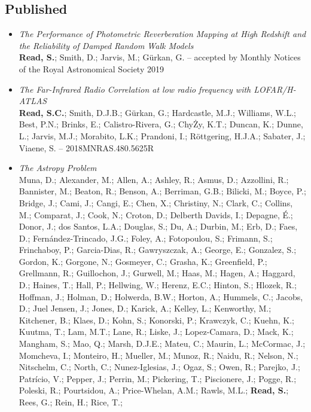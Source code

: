 \documentclass[letterpaper]{twentysecondcv} %
\begin{document}
\begin{finalpages}
\subsection{Published}
\begin{itemize}
     \item \textit{The Performance of Photometric Reverberation Mapping at High Redshift
and the Reliability of Damped Random Walk Models}\\{\small \textbf{Read, S.}; Smith, D.; Jarvis, M.; Gürkan, G. -- accepted by Monthly Notices of the Royal Astronomical Society 2019}
 \item \textit{The Far-Infrared Radio Correlation at low radio frequency with
LOFAR/H-ATLAS}\\{\small \textbf{Read, S.C.}; Smith, D.J.B.; Gürkan, G.; Hardcastle, M.J.;
Williams, W.L.; Best, P.N.; Brinks, E.; Calistro-Rivera, G.; ChyŻy,
K.T.; Duncan, K.; Dunne, L.; Jarvis, M.J.; Morabito, L.K.; Prandoni, I.;
Röttgering, H.J.A.; Sabater, J.; Viaene, S. -- 2018MNRAS.480.5625R}
 \item \textit{The Astropy Problem}\\{\small Muna, D.; Alexander, M.; Allen, A.; Ashley, R.; Asmus, D.; Azzollini,
R.; Bannister, M.; Beaton, R.; Benson, A.; Berriman, G.B.; Bilicki, M.;
Boyce, P.; Bridge, J.; Cami, J.; Cangi, E.; Chen, X.; Christiny, N.;
Clark, C.; Collins, M.; Comparat, J.; Cook, N.; Croton, D.; Delberth
Davids, I.; Depagne, É.; Donor, J.; dos Santos, L.A.; Douglas, S.; Du,
A.; Durbin, M.; Erb, D.; Faes, D.; Fernández-Trincado, J.G.; Foley, A.;
Fotopoulou, S.; Frimann, S.; Frinchaboy, P.; Garcia-Dias, R.;
Gawryszczak, A.; George, E.; Gonzalez, S.; Gordon, K.; Gorgone, N.;
Gosmeyer, C.; Grasha, K.; Greenfield, P.; Grellmann, R.; Guillochon, J.;
Gurwell, M.; Haas, M.; Hagen, A.; Haggard, D.; Haines, T.; Hall, P.;
Hellwing, W.; Herenz, E.C.; Hinton, S.; Hlozek, R.; Hoffman, J.; Holman,
D.; Holwerda, B.W.; Horton, A.; Hummels, C.; Jacobs, D.; Juel Jensen,
J.; Jones, D.; Karick, A.; Kelley, L.; Kenworthy, M.; Kitchener, B.;
Klaes, D.; Kohn, S.; Konorski, P.; Krawczyk, C.; Kuehn, K.; Kuutma, T.;
Lam, M.T.; Lane, R.; Liske, J.; Lopez-Camara, D.; Mack, K.; Mangham, S.;
Mao, Q.; Marsh, D.J.E.; Mateu, C.; Maurin, L.; McCormac, J.; Momcheva,
I.; Monteiro, H.; Mueller, M.; Munoz, R.; Naidu, R.; Nelson, N.;
Nitschelm, C.; North, C.; Nunez-Iglesias, J.; Ogaz, S.; Owen, R.;
Parejko, J.; Patrício, V.; Pepper, J.; Perrin, M.; Pickering, T.;
Piscionere, J.; Pogge, R.; Poleski, R.; Pourtsidou, A.; Price-Whelan,
A.M.; Rawls, M.L.; \textbf{Read, S.}; Rees, G.; Rein, H.; Rice, T.;
}
\end{itemize}
\end{finalpages}
\end{document}
